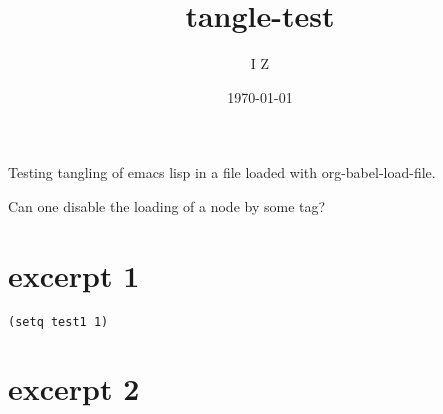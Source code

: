 \documentclass[11pt]{article}
\author{I Z}
\date{\today}
\title{tangle-test}
\begin{document}
\maketitle
\tableofcontents

Testing tangling of emacs lisp in a file loaded with org-babel-load-file. 

Can one disable the loading of a node by some tag?

\section{excerpt 1}
\label{sec-1}

\begin{verbatim}
(setq test1 1)
\end{verbatim}
\section{excerpt 2}
\label{sec-2}
\end{document}
